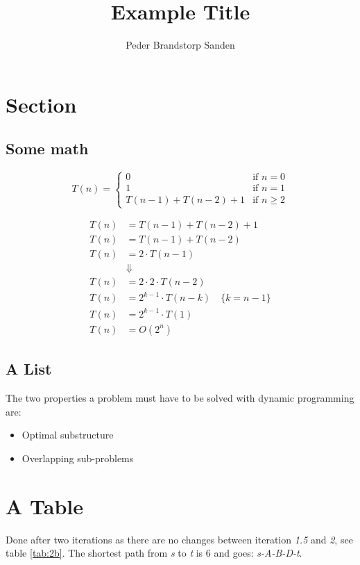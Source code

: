 \documentclass[12pt]{article}
\title{\vspace{-10ex}Example Title}
\author{Peder Brandstorp Sanden}
\date{}
\begin{document}
\maketitle

\section*{Section}
\subsection*{Some math}


  \begin{equation}
    T(n) = \begin{cases}
      0 & \text{if } n = 0\\
      1 & \text{if } n = 1\\
      T(n-1) + T(n-2) + 1 & \text{if } n \geq 2
      \label{defT(n)}
      \end{cases}
  \end{equation}

  \begin{equation}
    \begin{split}
      T(n) &= T(n-1) + T(n-2) + 1\\
      T(n) &= T(n-1) + T(n-2)\\
      T(n) &= 2 \cdot T(n-1)\\
      &\Downarrow \\
      T(n) &= 2 \cdot 2 \cdot T(n-2)\\
      T(n) &= 2^{k-1} \cdot T(n-k) \quad \{k = n-1\}\\
      T(n) &= 2^{k-1} \cdot T(1)\\
      T(n) &= O(2^n)
    \end{split}
  \end{equation}

\subsection*{A List}
The two properties a problem must have to be solved with dynamic programming are:
\begin{itemize}
  \item Optimal substructure
  \item Overlapping sub-problems
\end{itemize}

\section*{A Table}
Done after two iterations as there are no changes between iteration \textit{1.5} and \textit{2}, see table \ref{tab:2b}. The shortest path from \textit{s} to \textit{t} is 6 and goes: \textit{s-A-B-D-t}.
\end{document}
